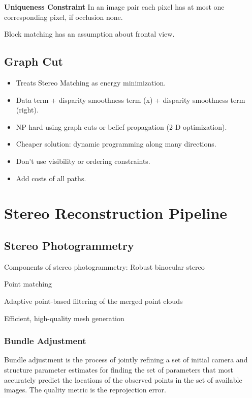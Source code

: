 \textbf{Uniqueness Constraint} 
In an image pair each pixel has at most one corresponding pixel, if occlusion none.

Block matching has an assumption about frontal view.

\subsection{Graph Cut}

\begin{itemize}
\item Treats Stereo Matching as energy minimization. 
\item Data term + disparity smoothness term (x) + disparity smoothness term (right).
\item NP-hard using graph cuts or belief propagation (2-D optimization).
\item Cheaper solution: dynamic programming along many directions.
\item Don’t use visibility or ordering constraints.
\item Add costs of all paths.
\end{itemize}

\section{Stereo Reconstruction Pipeline}

\subsection{Stereo Photogrammetry}

Components of stereo photogrammetry:
Robust binocular stereo

Point matching

Adaptive point-based filtering of the merged point clouds

Efficient, high-quality mesh generation

\subsubsection{Bundle Adjustment}

Bundle adjustment is the process of jointly refining a set of initial camera and structure parameter estimates for finding the set of parameters that most accurately predict the locations of the observed points in the set of available images. The quality metric is the reprojection error.

